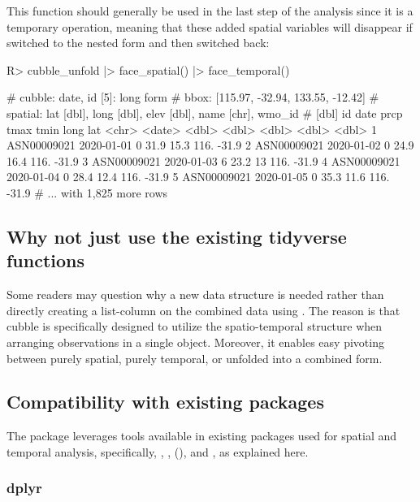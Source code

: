 \documentclass[
]{jss}
\begin{document}
This function should generally be used in the last step of the analysis since it is a temporary operation, meaning that these added spatial variables will disappear if switched to the nested form and then switched back:

\begin{CodeChunk}
\begin{CodeInput}
R> cubble_unfold |> face_spatial() |> face_temporal()
\end{CodeInput}
\begin{CodeOutput}
# cubble:  date, id [5]: long form
# bbox:    [115.97, -32.94, 133.55, -12.42]
# spatial: lat [dbl], long [dbl], elev [dbl], name [chr], wmo_id
#   [dbl]
  id          date        prcp  tmax  tmin  long   lat
  <chr>       <date>     <dbl> <dbl> <dbl> <dbl> <dbl>
1 ASN00009021 2020-01-01     0  31.9  15.3  116. -31.9
2 ASN00009021 2020-01-02     0  24.9  16.4  116. -31.9
3 ASN00009021 2020-01-03     6  23.2  13    116. -31.9
4 ASN00009021 2020-01-04     0  28.4  12.4  116. -31.9
5 ASN00009021 2020-01-05     0  35.3  11.6  116. -31.9
# ... with 1,825 more rows
\end{CodeOutput}
\end{CodeChunk}

\hypertarget{tidyverse}{%
\subsection{Why not just use the existing tidyverse functions}\label{tidyverse}}

Some readers may question why a new data structure is needed rather than directly creating a list-column on the combined data using . The reason is that cubble is specifically designed to utilize the spatio-temporal structure when arranging observations in a single object. Moreover, it enables easy pivoting between purely spatial, purely temporal, or unfolded into a combined form.

\hypertarget{compact}{%
\subsection{Compatibility with existing packages}\label{compact}}

The  package leverages tools available in existing packages used for spatial and temporal analysis, specifically, , ,  (), and , as explained here.

\hypertarget{dplyr}{%
\subsubsection{dplyr}\label{dplyr}}
\end{document}
